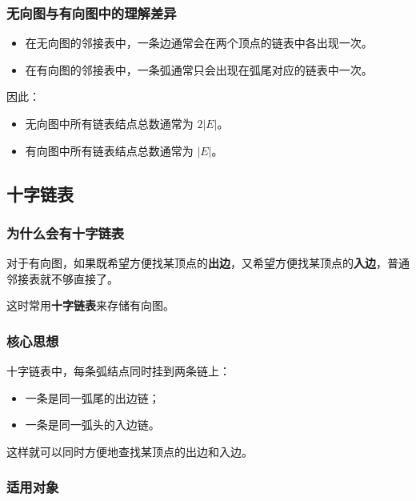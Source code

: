 \documentclass{../../note}
\begin{document}
\subsubsection{无向图与有向图中的理解差异}

\begin{itemize}
  \item 在无向图的邻接表中，一条边通常会在两个顶点的链表中各出现一次。
  \item 在有向图的邻接表中，一条弧通常只会出现在弧尾对应的链表中一次。
\end{itemize}

因此：

\begin{itemize}
  \item 无向图中所有链表结点总数通常为 $2|E|$。
  \item 有向图中所有链表结点总数通常为 $|E|$。
\end{itemize}

\subsection{十字链表}

\subsubsection{为什么会有十字链表}

对于有向图，如果既希望方便找某顶点的\textbf{出边}，又希望方便找某顶点的\textbf{入边}，普通邻接表就不够直接了。

这时常用\textbf{十字链表}来存储有向图。

\subsubsection{核心思想}

十字链表中，每条弧结点同时挂到两条链上：

\begin{itemize}
  \item 一条是同一弧尾的出边链；
  \item 一条是同一弧头的入边链。
\end{itemize}

这样就可以同时方便地查找某顶点的出边和入边。

\subsubsection{适用对象}
\end{document}
